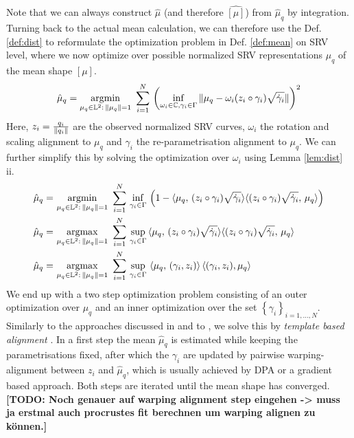 Note that we can always construct $\hat\mu$ (and therefore $\hat{[\mu]}$) from $\hat\mu_q$ by integration.
Turning back to the actual mean calculation, we can therefore use the Def. \ref{def:dist} to reformulate the optimization problem in Def. \ref{def:mean} on SRV level, where we now optimize over possible normalized SRV representations $\mu_q$ of the mean shape $[\mu]$. 
$$ \hat\mu_q = \operatorname*{argmin}_{\mu_q \in \mathbb{L}^2:\,\lVert\mu_q\rVert = 1}\,\,
  \sum_{i=1}^N \, \left( \inf_{\omega_i \in \mathbb{C}, \gamma_i \in \Gamma} \,
    \lVert\mu_q - \omega_i (z_i \circ \gamma_i) \sqrt{\dot\gamma_i}\rVert \right)^2 $$
Here, $z_i = \frac{q_i}{\lVert q_i\rVert}$ are the observed normalized SRV curves, $\omega_i$ the rotation and scaling alignment to $\mu_q$ and $\gamma_i$ the re-parametrisation alignment to $\mu_q$.
We can further simplify this by solving the optimization over $\omega_i$ using Lemma \ref{lem:dist} ii.
\begin{align*}
  \hat\mu_q = &\, \operatorname*{argmin}_{\mu_q \in \mathbb{L}^2:\,\lVert\mu_q\rVert = 1}\,\,
    \sum_{i=1}^N \,\inf_{\gamma_i \in \Gamma}\, \left(1 - \langle \mu_q,\,(z_i \circ \gamma_i) \sqrt{\dot\gamma_i} \rangle \langle (z_i \circ \gamma_i) \sqrt{\dot\gamma_i},\, \mu_q\rangle \right) \\
  \hat\mu_q = &\, \operatorname*{argmax}_{\mu_q \in \mathbb{L}^2:\,\lVert\mu_q\rVert = 1}\,\,
    \sum_{i=1}^N \,\sup_{\gamma_i \in \Gamma}\, \langle \mu_q,\,(z_i \circ \gamma_i) \sqrt{\dot\gamma_i} \rangle \langle (z_i \circ \gamma_i) \sqrt{\dot\gamma_i},\, \mu_q\rangle \\
  \hat\mu_q = &\, \operatorname*{argmax}_{\mu_q \in \mathbb{L}^2:\,\lVert\mu_q\rVert = 1}\,\,
    \sum_{i=1}^N \,\sup_{\gamma_i \in \Gamma}\, \left\langle \mu_q,\,(\gamma_i,z_i) \right\rangle \left\langle (\gamma_i, z_i), \mu_q \right\rangle
\end{align*}
We end up with a two step optimization problem consisting of an outer optimization over $\mu_q$ and an inner optimization over the set $\left\{\gamma_i\right\}_{i=1,\dots,N}$.
Similarly to the approaches discussed in \cite{SrivastavaKlassen2016} and to \cite{Steyer2021}, we solve this by \emph{template based alignment} \parencite[see e.g.][271]{SrivastavaKlassen2016}.
In a first step the mean $\hat\mu_q$ is estimated while keeping the parametrisations fixed, after which the $\gamma_i$ are updated by pairwise warping-alignment between $z_i$ and $\hat\mu_q$, which is usually achieved by DPA or a gradient based approach.
Both steps are iterated until the mean shape has converged.
\textbf{[TODO: Noch genauer auf warping alignment step eingehen -> muss ja erstmal auch procrustes fit berechnen um warping alignen zu können.]}

